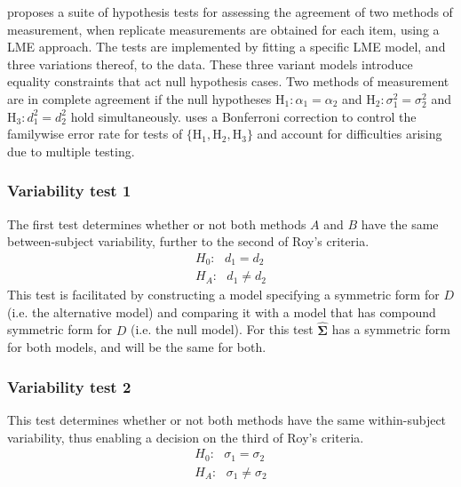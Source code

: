 \documentclass[12pt, a4paper]{report}
\theoremstyle{plain}
\theoremstyle{definition}
\theoremstyle{remark}
\begin{document}
	
	\citet{ARoy2009} proposes a suite of hypothesis tests for assessing the agreement of two methods of measurement, when replicate measurements are obtained for each item, using a LME approach. The tests are implemented by fitting a specific LME model, and three variations thereof, to the data. These three variant models introduce equality constraints that act null hypothesis cases.
	Two methods of measurement are in complete agreement if the null hypotheses $\mathrm{H}_1\colon \alpha_1 = \alpha_2$ and $\mathrm{H}_2\colon \sigma^2_1 = \sigma^2_2 $ and $\mathrm{H}_3\colon d^2_1= d^2_2$ hold simultaneously. \citet{ARoy2009} uses a Bonferroni correction to control the familywise error rate for tests of $\{\mathrm{H}_1, \mathrm{H}_2, \mathrm{H}_3\}$ and account for difficulties arising due to multiple testing. 
	
	
	
	
	
	
	
	
	
	
	
	
	
	
	

	\subsubsection{Variability test 1}
	The first test determines whether or not both methods $A$ and $B$ have the same between-subject variability, further to the second of Roy's criteria.
	\begin{eqnarray*}
		H_{0}: \mbox{ }d_{1}  = d_{2} \\
		H_{A}: \mbox{ }d_{1}  \neq d_{2}
	\end{eqnarray*}
	This test is facilitated by constructing a model specifying a symmetric form for $D$ (i.e. the alternative model) and comparing it with a model that has compound symmetric form for $D$ (i.e. the null model). For this test $\boldsymbol{\hat{\Sigma}}$ has a symmetric form for both models, and will be the same for both.
		
	\subsubsection{Variability test 2}
	
	This test determines whether or not both methods have the same within-subject variability, thus enabling a decision on the third of Roy's criteria.
	\begin{eqnarray*}
		H_{0}: \mbox{ }\sigma_{1}  = \sigma_{2} \\
		H_{A}: \mbox{ }\sigma_{1}  \neq \sigma_{2}
	\end{eqnarray*}
	
\end{document}
